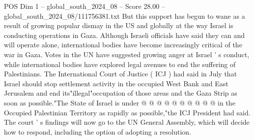 \begin{textsample}{POS Dim 1 – global\_south\_2024\_08 – Score 28.00 – global\_south\_2024\_08/111756381.txt}
But this support has begun to wane as a result of growing popular dismay in the US and globally at the way Israel is conducting operations in Gaza.
Although Israeli officials have said they can and will operate alone, international bodies have become increasingly critical of the war in Gaza.
Votes in the UN have suggested growing anger at Israel ' s conduct, while international bodies have explored legal avenues to end the suffering of Palestinians.
The International Court of Justice ( ICJ ) had said in July that Israel should stop settlement activity in the occupied West Bank and East Jerusalem and end its"illegal"occupation of those areas and the Gaza Strip as soon as possible."The State of Israel is under @ @ @ @ @ @ @ @ @ @ in the Occupied Palestinian Territory as rapidly as possible,"the ICJ President had said.
The court ' s findings will now go to the UN General Assembly, which will decide how to respond, including the option of adopting a resolution.

\end{textsample}
